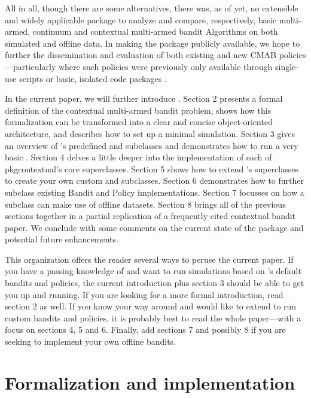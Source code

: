 \documentclass{jss}
\begin{document}
All in all, though there are some alternatives, there was, as of yet, no extensible and widely applicable  package to analyze and compare, respectively, basic multi-armed, continuum \citep{Agrawal1995} and contextual multi-armed bandit Algorithms on both simulated and offline data. In making the package publicly available, we hope to further the dissemination and evaluation of both existing and new CMAB policies---particularly where such policies were previously only available through single-use scripts or basic, isolated code packages \citep{Gandrud2016}.

In the current paper, we will further introduce . Section 2 presents a formal definition of the contextual multi-armed bandit problem, shows how this formalization can be transformed into a clear and concise object-oriented architecture, and describes how to set up a minimal simulation. Section 3 gives an overview of 's predefined  and  subclasses and demonstrates how to run a very basic . Section 4 delves a little deeper into the implementation of each of pkg{contextual}'s core superclasses. Section 5 shows how to extend 's superclasses to create your own custom  and  subclasses. Section 6 demonstrates how to further subclass existing Bandit and Policy implementations. Section 7 focusses on how a  subclass can make use of offline datasets. Section 8 brings all of the previous sections together in a partial replication of a frequently cited contextual bandit paper. We conclude with some comments on the current state of the package and potential future enhancements.

This organization offers the reader several ways to peruse the current paper. If you have a passing knowledge of  and want to run simulations based on 's default bandits and policies, the current introduction plus section 3 should be able to get you up and running. If you are looking for a more formal introduction, read section 2 as well. If you know your way around  and would like to extend  to run custom bandits and policies, it is probably best to read the whole paper---with a focus on sections 4, 5 and 6. Finally, add sections 7 and possibly 8 if you are seeking to implement your own offline bandits.

\section{Formalization and implementation} \label{formalizationandimplementation}
\end{document}
